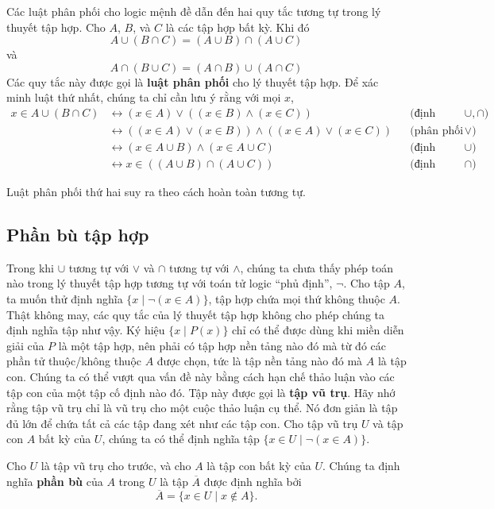 Các luật phân phối cho logic mệnh đề dẫn đến hai quy tắc tương tự trong lý thuyết tập hợp. Cho $A$, $B$, và $C$ là các tập hợp bất kỳ. Khi đó
\[
A \cup (B \cap C) = (A \cup B) \cap (A \cup C)
\]
và
\[
A \cap (B \cup C) = (A \cap B) \cup (A \cap C)
\]
Các quy tắc này được gọi là \textbf{luật phân phối} cho lý thuyết tập hợp. Để xác minh luật thứ nhất, chúng ta chỉ cần lưu ý rằng với mọi $x$,
\begin{align*}
x \in A \cup (B \cap C) &\leftrightarrow (x \in A) \lor ((x \in B) \land (x \in C)) & &\text{(định nghĩa } \cup, \cap\text{)} \\
&\leftrightarrow ((x \in A) \lor (x \in B)) \land ((x \in A) \lor (x \in C)) & &\text{(phân phối } \lor\text{)} \\
&\leftrightarrow (x \in A \cup B) \land (x \in A \cup C) & &\text{(định nghĩa } \cup\text{)} \\
&\leftrightarrow x \in ((A \cup B) \cap (A \cup C)) & &\text{(định nghĩa } \cap\text{)}
\end{align*}

Luật phân phối thứ hai suy ra theo cách hoàn toàn tương tự.

\subsection{Phần bù tập hợp}

Trong khi $\cup$ tương tự với $\lor$ và $\cap$ tương tự với $\land$, chúng ta chưa thấy phép toán nào trong lý thuyết tập hợp tương tự với toán tử logic ``phủ định'', $\neg$. Cho tập $A$, ta muốn thử định nghĩa $\{x \mid \neg(x \in A)\}$, tập hợp chứa mọi thứ không thuộc $A$. Thật không may, các quy tắc của lý thuyết tập hợp không cho phép chúng ta định nghĩa tập như vậy. Ký hiệu $\{x \mid P(x)\}$ chỉ có thể được dùng khi miền diễn giải của $P$ là một tập hợp, nên phải có tập hợp nền tảng nào đó mà từ đó các phần tử thuộc/không thuộc $A$ được chọn, tức là tập nền tảng nào đó mà $A$ là tập con. Chúng ta có thể vượt qua vấn đề này bằng cách hạn chế thảo luận vào các tập con của một tập cố định nào đó. Tập này được gọi là \textbf{tập vũ trụ}. Hãy nhớ rằng tập vũ trụ chỉ là vũ trụ cho một cuộc thảo luận cụ thể. Nó đơn giản là tập đủ lớn để chứa tất cả các tập đang xét như các tập con. Cho tập vũ trụ $U$ và tập con $A$ bất kỳ của $U$, chúng ta có thể định nghĩa tập $\{x \in U \mid \neg(x \in A)\}$.

\begin{definition}
\label{def:4.1}
Cho $U$ là tập vũ trụ cho trước, và cho $A$ là tập con bất kỳ của $U$. Chúng ta định nghĩa \textbf{phần bù} của $A$ trong $U$ là tập $\overline{A}$ được định nghĩa bởi
\[
\overline{A} = \{x \in U \mid x \notin A\}.
\]
\end{definition}

